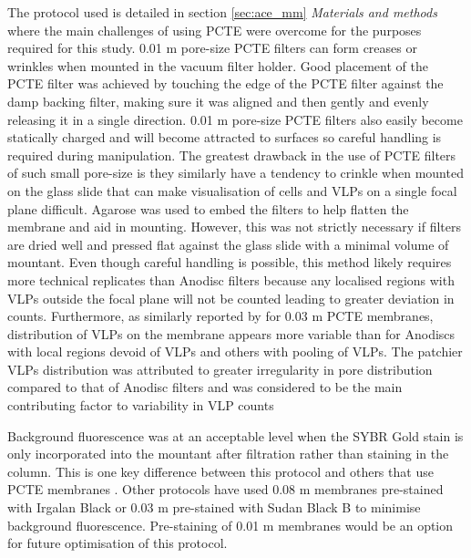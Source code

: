 The protocol used is detailed in section \ref{sec:ace_mm} \emph{Materials and methods} where the main challenges of using \ac{PCTE} were overcome for the purposes required for this study.
0.01 \textmu{}m pore-size \ac{PCTE} filters can form creases or wrinkles when mounted in the vacuum filter holder.
Good placement of the \ac{PCTE} filter was achieved by touching the edge of the \ac{PCTE} filter against the damp backing filter, making sure it was aligned and then gently and evenly releasing it in a single direction. 
0.01 \textmu{}m pore-size \ac{PCTE} filters also easily become statically charged and will become attracted to surfaces so careful handling is required during manipulation. 
The greatest drawback in the use of \ac{PCTE} filters of such small pore-size is they similarly have a tendency to crinkle when mounted on the glass slide that can make visualisation of cells and \acp{VLP} on a single focal plane difficult.
Agarose was used to embed the filters to help flatten the membrane and aid in mounting.
However, this was not strictly necessary if filters are dried well and pressed flat against the glass slide with a minimal volume of mountant.
Even though careful handling is possible, this method likely requires more technical replicates than Anodisc filters because any localised regions with \acp{VLP} outside the focal plane will not be counted leading to greater deviation in counts.
Furthermore, as similarly reported by \citet{Diemer2012} for 0.03 \textmu{}m \ac{PCTE} membranes, distribution of \acp{VLP} on the membrane appears more variable than for Anodiscs with local regions devoid of \acp{VLP} and others with pooling of \acp{VLP}.
The patchier \acp{VLP} distribution was attributed to greater irregularity in pore distribution compared to that of Anodisc filters and was considered to be the main contributing factor to variability in \ac{VLP} counts \cite{Diemer2012}

Background fluorescence was at an acceptable level when the SYBR Gold stain is only incorporated into the mountant after filtration rather than staining in the column.
This is one key difference between this protocol and others that use \ac{PCTE} membranes \cite{Hara1991, Proctor1992, Diemer2012}.
Other protocols have used 0.08 \textmu{}m membranes pre-stained with Irgalan Black \cite{Proctor1992} or 0.03 \textmu{}m pre-stained with Sudan Black B \cite{Diemer2012} to minimise background fluorescence.
Pre-staining of 0.01 \textmu{}m membranes would be an option for future optimisation of this protocol.

